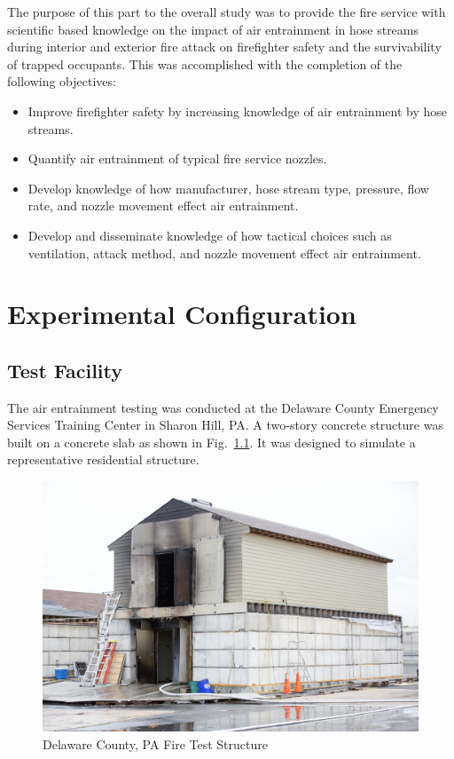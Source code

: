 \documentclass[12pt,oneside]{book}
\begin{document}
The purpose of this part to the overall study was to provide the fire service with scientific based knowledge on the impact of air entrainment in hose streams during interior and exterior fire attack on firefighter safety and the survivability of trapped occupants. This was accomplished with the completion of the following objectives:

\begin{itemize}
	\item Improve firefighter safety by increasing knowledge of air entrainment by hose streams.
	\item Quantify air entrainment of typical fire service nozzles. 
	\item Develop knowledge of how manufacturer, hose stream type, pressure, flow rate, and nozzle movement effect air entrainment.
	\item Develop and disseminate knowledge of how tactical choices such as ventilation, attack method, and nozzle movement effect air entrainment. 
	\end{itemize}


\chapter{Experimental Configuration}

\section{Test Facility}

The air entrainment testing was conducted at the Delaware County Emergency Services Training Center in Sharon Hill, PA. A two-story concrete structure was built on a concrete slab as shown in Fig.~\ref{fig:Delaware_County,_PA_Fire_Test_Structure}. It was designed to simulate a representative residential structure. 

\begin{figure}[!ht]
	\centering
	\includegraphics[width=\columnwidth]{Figures/Air_Entrainment/delcocorner.jpg}
	\caption{Delaware County, PA Fire Test Structure}
	\label{fig:Delaware_County,_PA_Fire_Test_Structure}
\end{figure}
\end{document}
